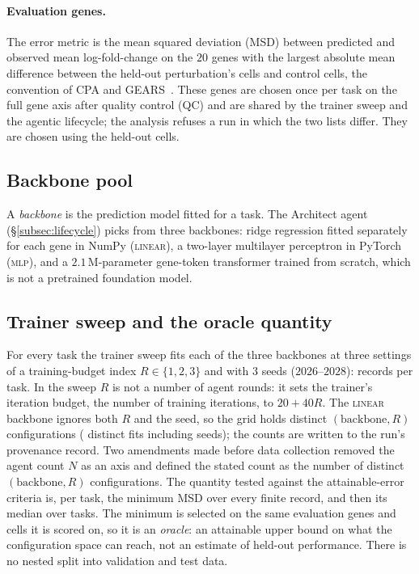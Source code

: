 \paragraph{Evaluation genes.} The error metric is the mean squared deviation (MSD) between
predicted and observed mean log-fold-change on the $20$ genes with the largest absolute mean
difference between the held-out perturbation's cells and control cells, the convention of
CPA and GEARS~\citep{lotfollahi2023cpa,roohani2024gears}. These genes are chosen once per task
on the full gene axis after quality control (QC) and are shared by the trainer sweep and the agentic lifecycle;
the analysis refuses a run in which the two lists differ. They are chosen using the
held-out cells.

\subsection{Backbone pool}\label{subsec:backbones}

A \emph{backbone} is the prediction model fitted for a task. The Architect agent
(\S\ref{subsec:lifecycle}) picks from three backbones: ridge regression fitted separately for each gene
in NumPy (\textsc{linear}), a two-layer multilayer perceptron in PyTorch (\textsc{mlp}), and a
$2.1$\,M-parameter gene-token transformer trained from scratch, which is not a pretrained
foundation model.

\subsection{Trainer sweep and the oracle quantity}\label{subsec:oracle}

For every task the trainer sweep fits each of the three backbones at three settings of a
training-budget index $R\in\{1,2,3\}$ and with $3$ seeds ($2026$--$2028$):
\resNTrainerRecordsPerTask{} records per task. In the sweep $R$ is not a number of agent
rounds: it sets the trainer's iteration budget, the number of training iterations, to
$20+40R$. The
\textsc{linear} backbone ignores both $R$ and the seed, so the grid holds
\resNDistinctConfigs{} distinct $(\text{backbone}, R)$ configurations
(\resNDistinctFits{} distinct fits including seeds); the counts are written to the run's
provenance record.
Two amendments made before data collection removed the agent count $N$ as an axis and
defined the stated count as the number of distinct $(\text{backbone}, R)$ configurations. The
quantity tested against the attainable-error criteria is,
per task, the minimum MSD over every finite record, and then its median over tasks. The
minimum is selected on the same evaluation genes and cells it is scored on, so it is an
\emph{oracle}: an attainable upper bound on what the configuration space can reach, not an
estimate of held-out performance. There is no nested split into validation and test data.

